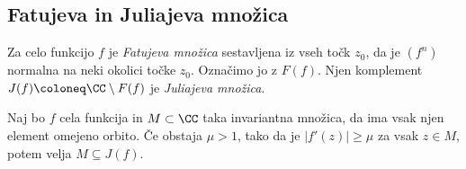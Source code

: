 \subsection{Fatujeva in Juliajeva množica}

Za celo funkcijo \(f\) je \emph{Fatujeva množica} sestavljena iz vseh točk \(z_0\), da je \((f^n)\) normalna na neki okolici točke \(z_0\). Označimo jo z \(F (f)\). Njen komplement \(J (f) \coloneq \CC \setminus F (f)\) je \emph{Juliajeva množica}.

\begin{izrek} \label{thm:julm}
    Naj bo \(f\) cela funkcija in \(M \subset \CC\) taka invariantna množica, da ima vsak njen element omejeno orbito. Če obstaja \(\mu > 1\), tako da je \(|f' (z)| \geq \mu\) za vsak \(z \in M\), potem velja \(M \subseteq J (f)\).
\end{izrek}